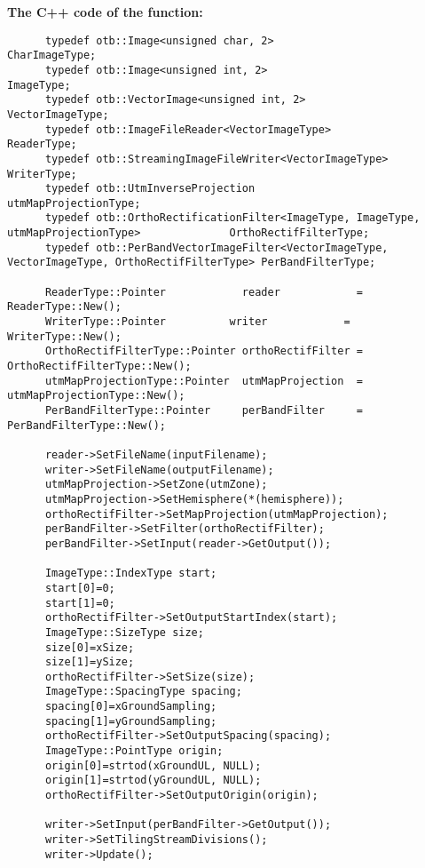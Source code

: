       \textbf{The C++ code of the function:}\\
\begin{verbatim}
      typedef otb::Image<unsigned char, 2>                    CharImageType;
      typedef otb::Image<unsigned int, 2>                     ImageType;
      typedef otb::VectorImage<unsigned int, 2>               VectorImageType;
      typedef otb::ImageFileReader<VectorImageType>           ReaderType;
      typedef otb::StreamingImageFileWriter<VectorImageType>  WriterType;
      typedef otb::UtmInverseProjection                       utmMapProjectionType;
      typedef otb::OrthoRectificationFilter<ImageType, ImageType, utmMapProjectionType>              OrthoRectifFilterType;
      typedef otb::PerBandVectorImageFilter<VectorImageType, VectorImageType, OrthoRectifFilterType> PerBandFilterType;

      ReaderType::Pointer            reader            = ReaderType::New();
      WriterType::Pointer	       writer            = WriterType::New();
      OrthoRectifFilterType::Pointer orthoRectifFilter = OrthoRectifFilterType::New();
      utmMapProjectionType::Pointer  utmMapProjection  = utmMapProjectionType::New();
      PerBandFilterType::Pointer     perBandFilter     = PerBandFilterType::New();

      reader->SetFileName(inputFilename);
      writer->SetFileName(outputFilename);
      utmMapProjection->SetZone(utmZone);
      utmMapProjection->SetHemisphere(*(hemisphere));
      orthoRectifFilter->SetMapProjection(utmMapProjection);
      perBandFilter->SetFilter(orthoRectifFilter);
      perBandFilter->SetInput(reader->GetOutput());

      ImageType::IndexType start;
      start[0]=0;
      start[1]=0;
      orthoRectifFilter->SetOutputStartIndex(start);
      ImageType::SizeType size;
      size[0]=xSize;
      size[1]=ySize;
      orthoRectifFilter->SetSize(size);
      ImageType::SpacingType spacing;
      spacing[0]=xGroundSampling;
      spacing[1]=yGroundSampling;
      orthoRectifFilter->SetOutputSpacing(spacing);
      ImageType::PointType origin;
      origin[0]=strtod(xGroundUL, NULL);
      origin[1]=strtod(yGroundUL, NULL);
      orthoRectifFilter->SetOutputOrigin(origin);

      writer->SetInput(perBandFilter->GetOutput()); 	
      writer->SetTilingStreamDivisions();
      writer->Update();
\end{verbatim}

